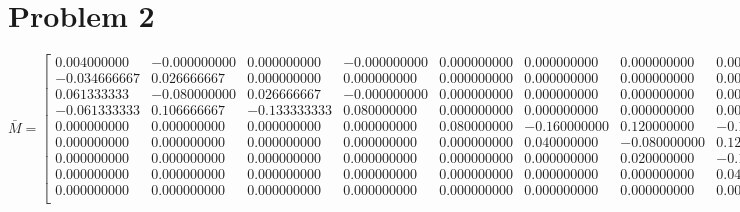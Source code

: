 \documentclass{article}
\begin{document}
\section*{Problem 2}
\begin{equation*}
\bar{M}=%
\begin{bmatrix}{}
  0.004000000 & -0.000000000 & 0.000000000 & -0.000000000 & 0.000000000 & 0.000000000 & 0.000000000 & 0.000000000 & 0.000000000 \\ 
  -0.034666667 & 0.026666667 & 0.000000000 & 0.000000000 & 0.000000000 & 0.000000000 & 0.000000000 & 0.000000000 & 0.000000000 \\ 
  0.061333333 & -0.080000000 & 0.026666667 & -0.000000000 & 0.000000000 & 0.000000000 & 0.000000000 & 0.000000000 & 0.000000000 \\ 
  -0.061333333 & 0.106666667 & -0.133333333 & 0.080000000 & 0.000000000 & 0.000000000 & 0.000000000 & 0.000000000 & 0.000000000 \\ 
  0.000000000 & 0.000000000 & 0.000000000 & 0.000000000 & 0.080000000 & -0.160000000 & 0.120000000 & -0.120000000 & 0.106666667 \\ 
  0.000000000 & 0.000000000 & 0.000000000 & 0.000000000 & 0.000000000 & 0.040000000 & -0.080000000 & 0.120000000 & -0.106666667 \\ 
  0.000000000 & 0.000000000 & 0.000000000 & 0.000000000 & 0.000000000 & 0.000000000 & 0.020000000 & -0.100000000 & 0.106666667 \\ 
  0.000000000 & 0.000000000 & 0.000000000 & 0.000000000 & 0.000000000 & 0.000000000 & 0.000000000 & 0.040000000 & -0.066666667 \\ 
  0.000000000 & 0.000000000 & 0.000000000 & 0.000000000 & 0.000000000 & 0.000000000 & 0.000000000 & 0.000000000 & 0.013333333 \\ 
  \end{bmatrix}
\end{equation*}
\end{document}
